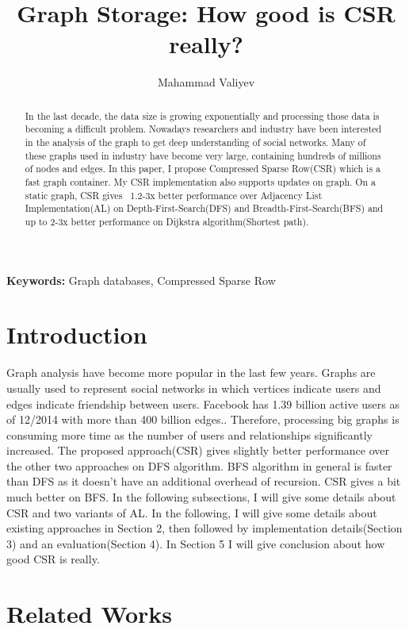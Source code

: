 \documentclass{article}
\title{Graph Storage: How good is CSR really?}
\author{Mahammad Valiyev}
\begin{document}
\maketitle

\begin{abstract}
  In the last decade, the data size is growing exponentially and processing those data is becoming a difficult problem. Nowadays researchers and industry have been interested in the analysis of the graph to get deep understanding of social networks. Many of these graphs used in industry have become very large, containing hundreds of millions of nodes and edges. In this paper, I propose Compressed Sparse Row(CSR) which is a fast graph container. My CSR implementation also supports updates on graph. On a static graph, CSR gives ~1.2-3x better performance over Adjacency List Implementation(AL) on Depth-First-Search(DFS) and Breadth-First-Search(BFS) and up to 2-3x better performance on Dijkstra algorithm(Shortest path).
\end{abstract}
\textbf{Keywords:} Graph databases, Compressed Sparse Row

\section{Introduction}
Graph analysis have become more popular in the last few years. Graphs are usually used to represent social networks in which vertices indicate users and edges indicate friendship between users. Facebook has 1.39 billion  active users as of 12/2014 with more than 400 billion edges.\cite{fb}. Therefore, processing big graphs is consuming more time as the number of users and relationships significantly increased. The proposed approach(CSR) gives slightly better performance over the other two approaches on DFS algorithm. BFS algorithm in general is faster than DFS as it doesn't have an additional overhead of recursion. CSR gives a bit much better on BFS. In the following subsections, I will give some details about CSR and two variants of AL. In the following, I will give some details about existing approaches in Section 2, then followed by implementation details(Section 3) and an evaluation(Section 4). In Section 5 I will give conclusion about how good CSR is really.

\section{Related Works}
\end{document}
